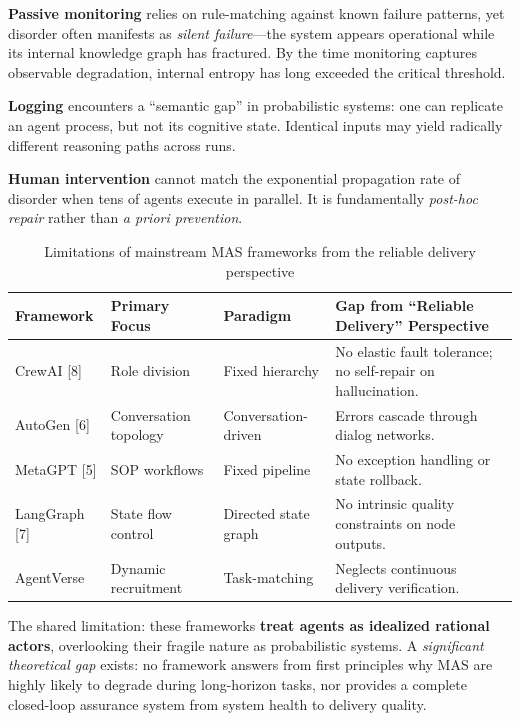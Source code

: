 \documentclass[11pt,a4paper]{article}
\begin{document}
\textbf{Passive monitoring} relies on rule-matching against known failure patterns, yet disorder often manifests as \emph{silent failure}---the system appears operational while its internal knowledge graph has fractured. By the time monitoring captures observable degradation, internal entropy has long exceeded the critical threshold.

\textbf{Logging} encounters a ``semantic gap'' in probabilistic systems: one can replicate an agent process, but not its cognitive state. Identical inputs may yield radically different reasoning paths across runs.

\textbf{Human intervention} cannot match the exponential propagation rate of disorder when tens of agents execute in parallel. It is fundamentally \emph{post-hoc repair} rather than \emph{a priori prevention}.

\begin{table}[H]
\centering
\small
\begin{tabular}{p{}p{}p{}p{}}
\toprule
\textbf{Framework} & \textbf{Primary Focus} & \textbf{Paradigm} & \textbf{Gap from ``Reliable Delivery'' Perspective} \\
\midrule
CrewAI [8] & Role division & Fixed hierarchy & No elastic fault tolerance; no self-repair on hallucination. \\
AutoGen [6] & Conversation topology & Conversation-driven & Errors cascade through dialog networks. \\
MetaGPT [5] & SOP workflows & Fixed pipeline & No exception handling or state rollback. \\
LangGraph [7] & State flow control & Directed state graph & No intrinsic quality constraints on node outputs. \\
AgentVerse & Dynamic recruitment & Task-matching & Neglects continuous delivery verification. \\
\bottomrule
\end{tabular}
\caption{Limitations of mainstream MAS frameworks from the reliable delivery perspective}
\label{tab:existing-frameworks}
\end{table}

The shared limitation: these frameworks \textbf{treat agents as idealized rational actors}, overlooking their fragile nature as probabilistic systems. A \emph{significant theoretical gap} exists: no framework answers from first principles why MAS are highly likely to degrade during long-horizon tasks, nor provides a complete closed-loop assurance system from system health to delivery quality.
\end{document}
